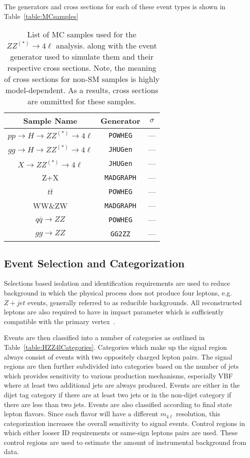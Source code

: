 The generators and cross sections for each of these event types 
is shown in Table~\ref{table:MCsamples}

\begin{table}
\begin{center}
\begin{tabular}{c|c|c}
\hline 
\hline
Sample Name & Generator & $\sigma$  \\ 
\hline
$pp\to H\to ZZ^{(*)}\to 4\ell$ & \verb+POWHEG+ & --- \\
$gg\to H\to ZZ^{(*)}\to 4\ell$ & \verb+JHUGen+ & --- \\
$X\to ZZ^{(*)}\to 4\ell$ & \verb+JHUGen+ & --- \\
Z+X & \verb+MADGRAPH+ & --- \\
$t\bar{t}$ & \verb+POWHEG+ & --- \\
WW\&ZW & \verb+MADGRAPH+ & --- \\
$q\bar{q}\to ZZ$ & \verb+POWHEG+ & --- \\
$gg\to ZZ$ & \verb+GG2ZZ+ & --- \\
\hline
\hline
\end{tabular}
\end{center}
\caption{List of MC samples used for the $ZZ^{(*)}\to 4\ell$ analysis.
along with the event generator used to simulate them and their
respective cross sections.  Note, the meaning of cross sections
for non-SM samples is highly model-dependent.  As a results, 
cross sections are ommitted for these samples.}
\label{table:HZZ4lMCsamples}
\end{table}

\subsection{Event Selection and Categorization}
\label{sec:HZZ4lselection}

Selections based isolation and identification
requirements are used to reduce background in which the physical
process does not produce four leptons, e.g. $Z+jet$ events, 
generally referred to as reducible backgrounds.  All 
reconstructed leptons are also required to have in impact
parameter which is sufficiently compatible with the primary 
vertex~\cite{CMS:xwa}.

Events are then classified into a number of categories as 
outlined in Table~\ref{table:HZZ4lCategories}.  Categories 
which make up the 
signal region always consist of events with two oppositely 
charged lepton pairs. The signal regions are then further 
subdivided into categories based on the number of jets 
which provides sensitivity to various
production mechanisms, especially VBF where at least two 
additional jets are always produced.  Events are either 
in the dijet tag category if there are at least two jets
or in the non-dijet category if there are less than two jets.  
Events are also classified according to final state lepton
flavors. Since each flavor will have a different $m_{4\ell}$
resolution, this categorization increases the overall
sensitivity to signal events. 
Control regions in which either looser ID requirements or 
same-sign leptons pairs are used.  These control regions
are used to estimate the amount of 
instrumental background from data. 

